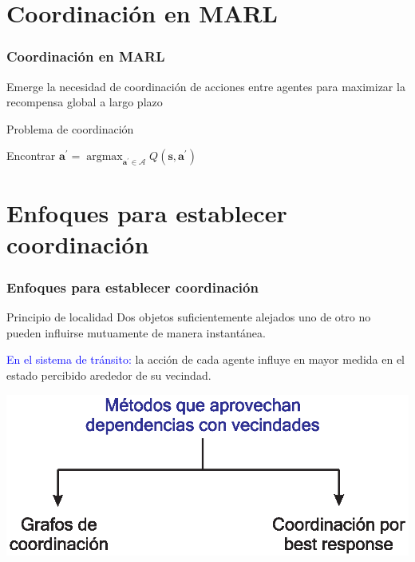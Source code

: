 \documentclass[11pt]{beamer}
\DeclareMathOperator*{\argmax}{argmax}
\begin{document}
\section{Coordinación en MARL}
\begin{frame}
\frametitle{Coordinación en MARL}
Emerge la necesidad de coordinación de acciones entre agentes para maximizar la recompensa global a largo plazo\\
\bigskip
\begin{alertblock}{Problema de coordinación}
\begin{center}
Encontrar $\mathbf{a}^\prime = \argmax_{\mathbf{a}^\prime \in \mathcal{A}}Q(\mathbf{s},\mathbf{a}^\prime)$
\end{center}
\end{alertblock}
\end{frame}


\section{Enfoques para establecer coordinación}
\begin{frame}
\frametitle{Enfoques para establecer coordinación}
\begin{block}{Principio de localidad}
Dos objetos suficientemente alejados uno de otro no pueden influirse mutuamente de manera instantánea.
\end{block}
\bigskip
\textcolor{blue}{En el sistema de tránsito:} la acción de cada agente influye en mayor medida en el estado percibido arededor de su vecindad.\\
\begin{center}
\includegraphics[scale=0.6]{./graficas/solProp.eps}
\end{center}

\end{frame}
\end{document}
